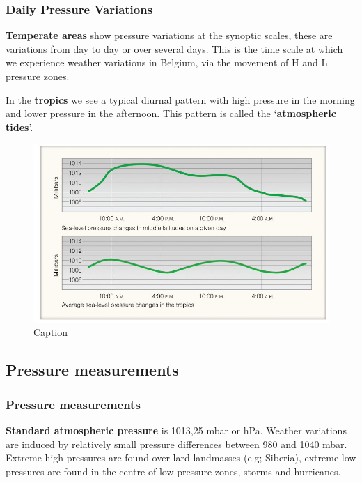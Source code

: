\documentclass[12pt,oneside]{book}
\begin{document}
\subsubsection{Daily Pressure
Variations}\label{daily-pressure-variations}

\textbf{Temperate areas} show pressure variations at the synoptic
scales, these are variations from day to day or over several days. This
is the time scale at which we experience weather variations in Belgium,
via the movement of H and L pressure zones.

In the \textbf{tropics} we see a typical diurnal pattern with high
pressure in the morning and lower pressure in the afternoon. This
pattern is called the `\textbf{atmospheric tides}'.

\begin{figure}

{\centering \includegraphics[width=0.8\linewidth]{figures/Figure42} 

}

\caption{Caption}\label{fig:dailyP}
\end{figure}

\subsection{Pressure measurements}\label{pressure-measurements}

\subsubsection{Pressure measurements}\label{pressure-measurements-1}

\textbf{Standard atmospheric pressure} is 1013,25 mbar or hPa. Weather
variations are induced by relatively small pressure differences between
980 and 1040 mbar. Extreme high pressures are found over lard landmasses
(e.g; Siberia), extreme low pressures are found in the centre of low
pressure zones, storms and hurricanes.
\end{document}

